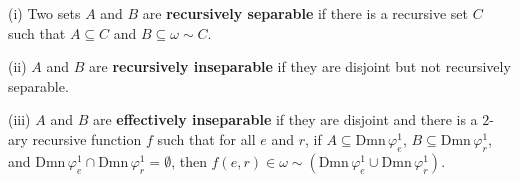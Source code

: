(i) Two sets $A$ and $B$ are \textbf{recursively separable} if there is a recursive set $C$ such that $A \subseteq C$ and $B \subseteq \omega \sim C$.

(ii) $A$ and $B$ are \textbf{recursively inseparable} if they are disjoint but not recursively separable.

(iii) $A$ and $B$ are \textbf{effectively inseparable} if they are disjoint and there is a $2$-ary recursive function $f$ such that for all $e$ and $r$, if $A \subseteq \mathrm{Dmn}\,\varphi_e^1$, $B \subseteq \mathrm{Dmn}\,\varphi_r^1$, and $\mathrm{Dmn}\,\varphi_e^1 \cap \mathrm{Dmn}\,\varphi_r^1 = \emptyset$, then $f(e, r) \in \omega \sim (\mathrm{Dmn}\,\varphi_e^1 \cup \mathrm{Dmn}\,\varphi_r^1)$.
